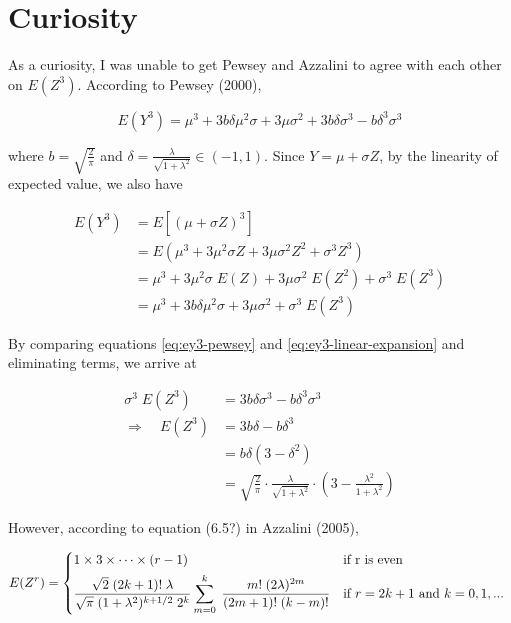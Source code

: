\section{Curiosity}

As a curiosity, I was unable to get Pewsey and Azzalini to agree with each
other on $E(Z^3)$. According to Pewsey (2000),

\begin{equation} \label{eq:ey3-pewsey}
  E(Y^3) = \mu^3 + 3 b \delta \mu^2 \sigma + 3 \mu \sigma^2 + 3 b \delta \sigma^3 - b \delta^3 \sigma^3
\end{equation}

where $b = \sqrt{\frac{2}{\pi}}$ and $\delta = \frac{\lambda}{\sqrt{1 +
\lambda^2}} \in (-1, 1)$. Since $Y = \mu + \sigma Z$, by the linearity of
expected value, we also have

\begin{align}
  E(Y^3) &= E \left[ (\mu + \sigma Z)^3 \right] \nonumber \\
  &= E (\mu^3 + 3 \mu^2 \sigma Z + 3 \mu \sigma^2 Z^2 + \sigma^3 Z^3) \nonumber \\
  &= \mu^3 + 3 \mu^2 \sigma\;E(Z) + 3 \mu \sigma^2\;E(Z^2) + \sigma^3\;E(Z^3) \nonumber \\
  &= \mu^3 + 3 b \delta \mu^2 \sigma + 3 \mu \sigma^2 + \sigma^3\;E(Z^3) \label{eq:ey3-linear-expansion}
\end{align}

By comparing equations \eqref{eq:ey3-pewsey} and
\eqref{eq:ey3-linear-expansion} and eliminating terms, we arrive at

\begin{align}
  \sigma^3\;E(Z^3) &= 3 b \delta \sigma^3 - b \delta^3 \sigma^3 \nonumber \\
  \Rightarrow \quad E(Z^3) &= 3 b \delta - b \delta^3 \nonumber \\
  &= b \delta (3 - \delta^2) \nonumber \\
  &= \sqrt{\frac{2}{\pi}} \cdot \frac{\lambda}{\sqrt{1 + \lambda^2}} \cdot \left( 3 - \frac{\lambda^2}{1 + \lambda^2} \right) \label{eq:ez3-pewsey-derived}
\end{align}

However, according to equation (6.5?) in Azzalini (2005),

\begin{equation}
  E(Z^r) =
  \begin{dcases*}
    1 \times 3 \times \cdots \times (r -1) & if r is even \\
    \frac{\sqrt{2}\;(2k + 1)!\;\lambda}{\sqrt{\pi}\;(1 + \lambda^2)^{k + 1/2}\;2^k} \sum_{m=0}^k\;\frac{m!\;(2\lambda)^{2m}}{(2m+1)!\;(k-m)!} & if $r = 2k+1$ and $k = 0, 1, ...$
  \end{dcases*}
\end{equation}

